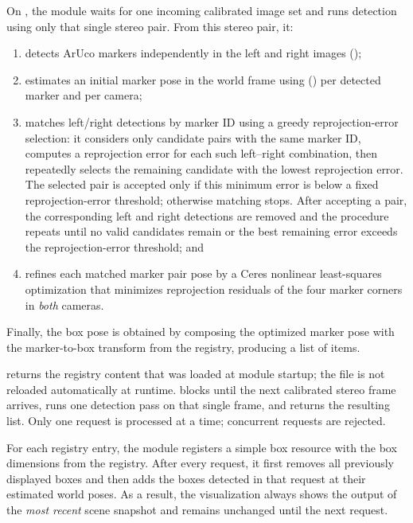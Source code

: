 On , the module waits for one incoming calibrated image set and runs detection using only that single stereo pair.
From this stereo pair, it:
\begin{enumerate}[label=(\roman*)]
    \item detects ArUco markers independently in the left and right images ();
    \item estimates an initial marker pose in the world frame using  () per detected marker and per camera;
    \item matches left/right detections by marker ID using a greedy reprojection-error selection:
    it considers only candidate pairs with the same marker ID, computes a reprojection error for each such left--right combination, then repeatedly selects the remaining candidate with the lowest reprojection error.
    The selected pair is accepted only if this minimum error is below a fixed reprojection-error threshold; otherwise matching stops.
    After accepting a pair, the corresponding left and right detections are removed and the procedure repeats until no valid candidates remain or the best remaining error exceeds the reprojection-error threshold; and
    \item refines each matched marker pair pose by a Ceres nonlinear least-squares optimization that minimizes reprojection residuals of the four marker corners in \emph{both} cameras.
\end{enumerate}

Finally, the box pose is obtained by composing the optimized marker pose with the marker-to-box transform from the registry, producing a list of  items.

 returns the registry content that was loaded at module startup; the file is not reloaded automatically at runtime.
 blocks until the next calibrated stereo frame arrives, runs one detection pass on that single frame, and returns the resulting list.
Only one  request is processed at a time; concurrent requests are rejected.

For each registry entry, the module registers a simple box resource with the box dimensions from the registry.
After every  request, it first removes all previously displayed boxes and then adds the boxes detected in that request at their estimated world poses.
As a result, the visualization always shows the output of the \emph{most recent} scene snapshot and remains unchanged until the next  request.

